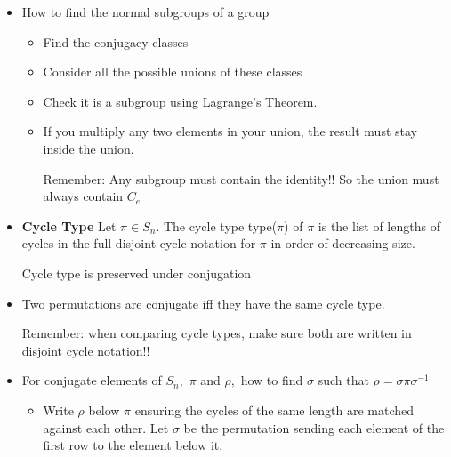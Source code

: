 \documentclass[a4paper, 12pt]
{article}
\begin{document}
\begin{itemize}
\begin{itemize}
			\item Check size of conjugacy class using  	$|C_g| = |G| / |C_G(g)|.$ Bound it by finding a lower bound for $|C_G(g)|$
			
			\item  Check conjugacy conditions between elements and stop when we have enough elements to meet the size of the conjugacy class 
		\end{itemize}
		
			A normal subgroup is a union of conjugacy classes of G.
		
		\item How to find the normal subgroups of a group
		\begin{itemize}
			\item Find the conjugacy classes
			
			\item Consider all the possible unions of these classes
			
			\item Check it is a subgroup using Lagrange's Theorem.
			
			\item If you multiply any two elements in your union, the result must stay inside the union.
			
			Remember: Any subgroup must contain the identity!!  So the union must always contain $C_e$
		\end{itemize}
		
		\item \textbf{Cycle Type} Let $\pi \in S_n.$ The cycle type type($\pi$) of $\pi$ is the list of lengths of cycles in the full disjoint cycle notation for $\pi$ in order of decreasing size.
		
		Cycle type is preserved under conjugation
		
		\item Two permutations are conjugate iff they have the same cycle type.
		
		Remember: when comparing cycle types, make sure both are written in disjoint cycle notation!!
		
		\item For conjugate elements of $S_n,$  $\pi$ and  $\rho,$ how to find $\sigma$ such that $\rho = \sigma \pi \sigma^{-1}$
		
		\begin{itemize}
			\item Write $\rho$ below $\pi$ ensuring the cycles of the same length are matched against each other. Let $\sigma$ be the permutation sending each element of the first row to the element below it.
		\end{itemize}
		

\end{itemize}
\end{document}
